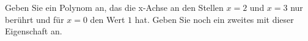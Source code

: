 \item Geben Sie ein Polynom an, das die x-Achse an den Stellen $x=2$ und $x=3$ nur berührt und für $x=0$ den Wert $1$ hat. Geben Sie noch ein zweites mit dieser Eigenschaft an. 
